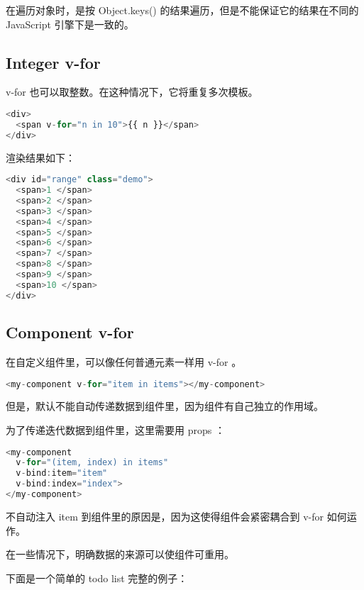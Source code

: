 在遍历对象时，是按 Object.keys() 的结果遍历，但是不能保证它的结果在不同的 JavaScript 引擎下是一致的。

\subsection{Integer v-for}

v-for 也可以取整数。在这种情况下，它将重复多次模板。


\begin{lstlisting}[language=JavaScript]
<div>
  <span v-for="n in 10">{{ n }}</span>
</div>
\end{lstlisting}



渲染结果如下：


\begin{lstlisting}[language=JavaScript]
<div id="range" class="demo">
  <span>1 </span>
  <span>2 </span>
  <span>3 </span>
  <span>4 </span>
  <span>5 </span>
  <span>6 </span>
  <span>7 </span>
  <span>8 </span>
  <span>9 </span>
  <span>10 </span>
</div>
\end{lstlisting}

\subsection{Component v-for}

在自定义组件里，可以像任何普通元素一样用 v-for 。

\begin{lstlisting}[language=JavaScript]
<my-component v-for="item in items"></my-component>
\end{lstlisting}

但是，默认不能自动传递数据到组件里，因为组件有自己独立的作用域。

为了传递迭代数据到组件里，这里需要用 props ：

\begin{lstlisting}[language=JavaScript]
<my-component
  v-for="(item, index) in items"
  v-bind:item="item"
  v-bind:index="index">
</my-component>
\end{lstlisting}


不自动注入 item 到组件里的原因是，因为这使得组件会紧密耦合到 v-for 如何运作。

在一些情况下，明确数据的来源可以使组件可重用。

下面是一个简单的 todo list 完整的例子：



